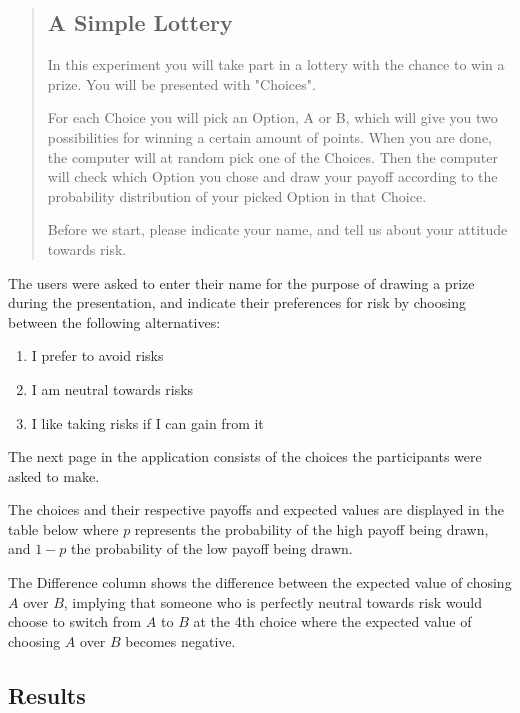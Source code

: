 \documentclass [12pt,a4paper,oneside]{article}
\begin{document}
\begin{quotation}
  
{\Large
\subsection*{A Simple Lottery}}
In this experiment you will take part in a lottery with the chance to win a prize. You will be presented with "Choices".

For each Choice you will pick an Option, A or B, which will give you two possibilities for winning a certain amount of points. When you are done, the computer will at random pick one of the Choices. Then the computer will check which Option you chose and draw your payoff according to the probability distribution of your picked Option in that Choice.

Before we start, please indicate your name, and tell us about your attitude towards risk.
\end{quotation}

The users were asked to enter their name for the purpose of drawing a prize during the presentation, and indicate their preferences for risk by choosing between the following alternatives:

\begin{enumerate}
  \item I prefer to avoid risks
  \item I am neutral towards risks
  \item I like taking risks if I can gain from it
\end{enumerate}

The next page in the application consists of the choices the participants were asked to make. 

The choices and their respective payoffs and expected values are displayed in the table below where $p$ represents the probability of the high payoff being drawn, and $1-p$ the probability of the low payoff being drawn. 

The Difference column shows the difference between the expected value of chosing $A$ over $B$, implying that someone who is perfectly neutral towards risk would choose to switch from $A$ to $B$ at the 4th choice where the expected value of choosing $A$ over $B$ becomes negative. 




\subsection{Results}
\end{document}
